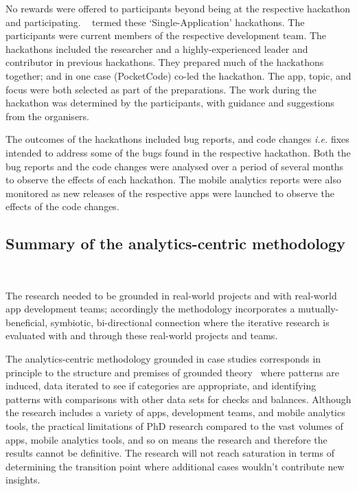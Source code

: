 No rewards were offered to participants beyond being at the respective hackathon and participating. ~ termed these `Single-Application' hackathons. The participants were current members of the respective development team.  The hackathons included the researcher and a highly-experienced leader and contributor in previous hackathons. They prepared much of the hackathons together; and in one case (PocketCode) co-led the hackathon. The app, topic, and focus were both selected as part of the preparations. The work during the hackathon was determined by the participants, with guidance and suggestions from the organisers.


The outcomes of the hackathons included bug reports, and code changes \emph{i.e.} fixes intended to address some of the bugs found in the respective hackathon. Both the bug reports and the code changes were analysed over a period of several months to observe the effects of each hackathon. The mobile analytics reports were also monitored as new releases of the respective apps were launched to observe the effects of the code changes.

\subsection{Summary of the analytics-centric methodology}~\label{analytics-centric-methodology-section}

The research needed to be grounded in real-world projects and with real-world app development teams; accordingly the methodology incorporates a mutually-beneficial, symbiotic, bi-directional connection where the iterative research is evaluated with and through these real-world projects and teams. 

The analytics-centric methodology grounded in case studies corresponds in principle to the structure and premises of grounded theory~ where patterns are induced, data iterated to see if categories are appropriate, and identifying patterns with comparisons with other data sets for checks and balances. Although the research includes a variety of apps, development teams, and mobile analytics tools, the practical limitations of PhD research compared to the vast volumes of apps, mobile analytics tools, and so on means the research and therefore the results cannot be definitive. The research will not reach saturation in terms of determining the transition point where additional cases wouldn't contribute new insights.


